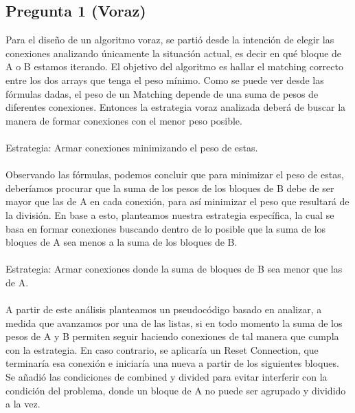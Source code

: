 \documentclass{article}
\begin{document}
	\subsection*{Pregunta 1 (Voraz)} 
	Para el diseño de un algoritmo voraz, se partió desde la intención de elegir las conexiones analizando únicamente la situación actual, es decir en qué bloque de A o B estamos iterando. El objetivo del algoritmo es hallar el matching correcto entre los dos arrays que tenga el peso mínimo. Como se puede ver desde las fórmulas dadas, el peso de un Matching depende de una suma de pesos de diferentes conexiones. Entonces la estrategia voraz analizada deberá de buscar la manera de formar conexiones con el menor peso posible.
	\\\\Estrategia: Armar conexiones minimizando el peso de estas.
	\\\\Observando las fórmulas, podemos concluir que para minimizar el peso de estas, deberíamos procurar que la suma de los pesos de los bloques de B debe de ser mayor que las de A en cada conexión, para así minimizar el peso que resultará de la división. En base a esto, planteamos nuestra estrategia específica, la cual se basa en formar conexiones buscando dentro de lo posible que la suma de los bloques de A sea menos a la suma de los bloques de B.\\\\ Estrategia: Armar conexiones donde la suma de bloques de B sea menor que las de A.\\\\
	A partir de este análisis planteamos un pseudocódigo basado en analizar, a medida que avanzamos por una de las listas, si en todo momento la suma de los pesos de A y B permiten seguir haciendo conexiones de tal manera que cumpla con la estrategia. En caso contrario, se aplicaría un Reset Connection, que terminaría esa conexión e iniciaría una nueva a partir de los siguientes bloques. Se añadió las condiciones de combined y divided para evitar interferir con la condición del problema, donde un bloque de A no puede ser agrupado y dividido a la vez.
	
\end{document}
